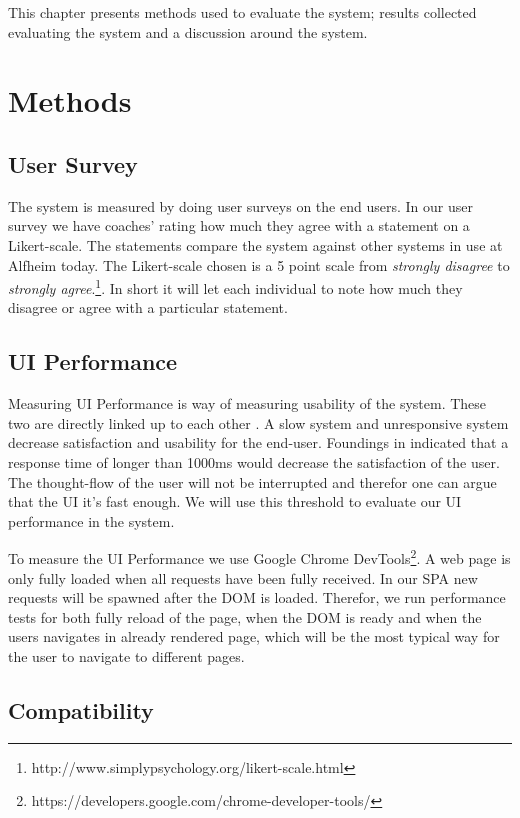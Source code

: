 This chapter presents methods used to evaluate the system; results collected evaluating the system and a discussion around the system. 

\section{Methods}
\subsection{User Survey}

The system is measured by doing user surveys on the end users. In our user survey we have coaches’ rating how much they agree with a statement on a Likert-scale. The statements compare the system against other systems in use at Alfheim today. The Likert-scale chosen is a 5 point scale from \textit{strongly disagree} to \textit{strongly agree}.\footnote{http://www.simplypsychology.org/likert-scale.html}. In short it will let each individual to note how much they disagree or agree with a particular statement.

\subsection{UI Performance}

Measuring \ac{UI} Performance is way of measuring usability of the system. These two are directly linked up to each other \cite{satisfaction}. A slow system and unresponsive system decrease satisfaction and usability for the end-user. Foundings in \cite{nielsen} indicated that a response time of longer than 1000ms would decrease the satisfaction of the user. The thought-flow of the user will not be interrupted and therefor one can argue that the \ac{UI} it's fast enough. We will use this threshold to evaluate our UI performance in the system. 

To measure the UI Performance we use Google Chrome DevTools\footnote{https://developers.google.com/chrome-developer-tools/}. A web page is only fully loaded when all requests have been fully received. In our \ac{SPA} new requests will be spawned after the \ac{DOM} is loaded. Therefor, we run performance tests for both fully reload of the page, when the DOM is ready and when the users navigates in already rendered page, which will be the most typical way for the user to navigate to different pages.

\subsection{Compatibility}

